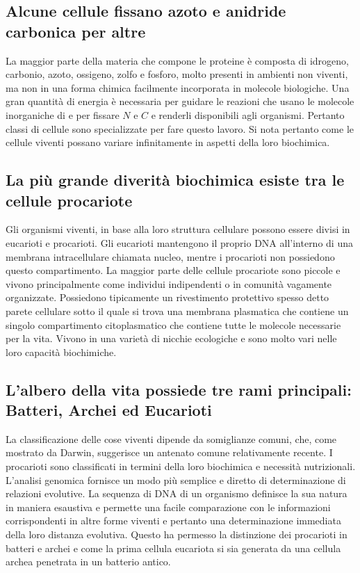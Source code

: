 \subsection{Alcune cellule fissano azoto e anidride carbonica per altre}
La maggior parte della materia che compone le proteine \`e composta di idrogeno, carbonio, azoto, ossigeno, zolfo e fosforo, molto presenti in ambienti non viventi, ma non in una forma
chimica facilmente incorporata in molecole biologiche. Una gran quantit\`a di energia \`e necessaria per guidare le reazioni che usano le molecole inorganiche di  e  per 
fissare $N$ e $C$ e renderli disponibili agli organismi. Pertanto classi di cellule sono specializzate per fare questo lavoro. Si nota pertanto come le cellule viventi possano variare 
infinitamente in aspetti della loro biochimica. 
\subsection{La pi\`u grande diverit\`a biochimica esiste tra le cellule procariote}
Gli organismi viventi, in base alla loro struttura cellulare possono essere divisi in eucarioti e procarioti. Gli eucarioti mantengono il proprio DNA all'interno di una membrana 
intracellulare chiamata nucleo, mentre i procarioti non possiedono questo compartimento. La maggior parte delle cellule procariote sono piccole e vivono principalmente come individui
indipendenti o in comunit\`a vagamente organizzate. Possiedono tipicamente un rivestimento protettivo spesso detto parete cellulare sotto il quale si trova una membrana plasmatica
che contiene un singolo compartimento citoplasmatico che contiene tutte le molecole necessarie per la vita. Vivono in una variet\`a di nicchie ecologiche e sono molto vari nelle loro
capacit\`a biochimiche. 
\subsection{L'albero della vita possiede tre rami principali: Batteri, Archei ed Eucarioti}
La classificazione delle cose viventi dipende da somiglianze comuni, che, come mostrato da Darwin, suggerisce un antenato comune relativamente recente. I procarioti sono classificati in
termini della loro biochimica e necessit\`a nutrizionali. L'analisi genomica fornisce un modo pi\`u semplice e diretto di determinazione di relazioni evolutive. La sequenza di DNA di 
un organismo definisce la sua natura in maniera esaustiva e permette una facile comparazione con le informazioni corrispondenti in altre forme viventi e pertanto una determinazione 
immediata della loro distanza evolutiva. Questo ha permesso la distinzione dei procarioti in batteri e archei e come la prima cellula eucariota si sia generata da una cellula archea 
penetrata in un batterio antico. 

